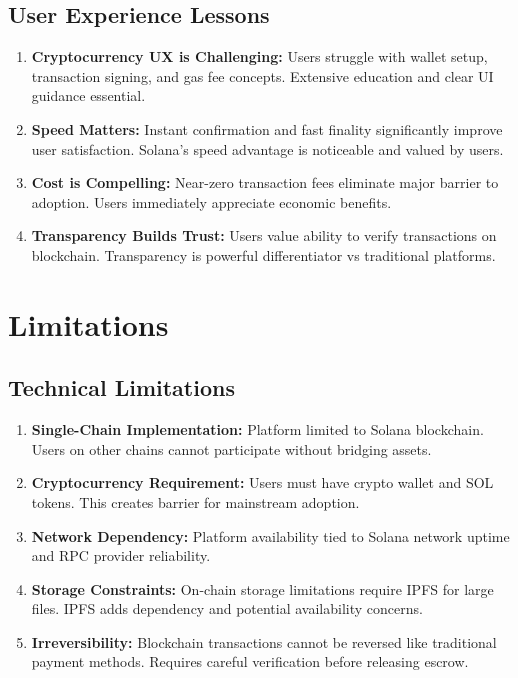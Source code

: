 \documentclass[a4paper,13pt,twoside]{report}
\theoremstyle{definition}
\begin{document}
\subsection{User Experience Lessons}

\begin{enumerate}
    \item \textbf{Cryptocurrency UX is Challenging:} Users struggle with wallet setup, transaction signing, and gas fee concepts. Extensive education and clear UI guidance essential.

    \item \textbf{Speed Matters:} Instant confirmation and fast finality significantly improve user satisfaction. Solana's speed advantage is noticeable and valued by users.

    \item \textbf{Cost is Compelling:} Near-zero transaction fees eliminate major barrier to adoption. Users immediately appreciate economic benefits.

    \item \textbf{Transparency Builds Trust:} Users value ability to verify transactions on blockchain. Transparency is powerful differentiator vs traditional platforms.
\end{enumerate}

\section{Limitations}

\subsection{Technical Limitations}

\begin{enumerate}
    \item \textbf{Single-Chain Implementation:} Platform limited to Solana blockchain. Users on other chains cannot participate without bridging assets.

    \item \textbf{Cryptocurrency Requirement:} Users must have crypto wallet and SOL tokens. This creates barrier for mainstream adoption.

    \item \textbf{Network Dependency:} Platform availability tied to Solana network uptime and RPC provider reliability.

    \item \textbf{Storage Constraints:} On-chain storage limitations require IPFS for large files. IPFS adds dependency and potential availability concerns.

    \item \textbf{Irreversibility:} Blockchain transactions cannot be reversed like traditional payment methods. Requires careful verification before releasing escrow.
\end{enumerate}
\end{document}
